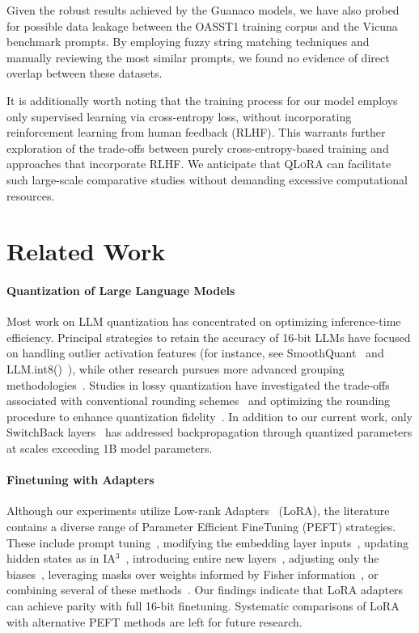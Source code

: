 Given the robust results achieved by the {Guanaco} models, we have also probed for possible data leakage between the OASST1 training corpus and the Vicuna benchmark prompts. By employing fuzzy string matching techniques and manually reviewing the most similar prompts, we found no evidence of direct overlap between these datasets.

It is additionally worth noting that the training process for our model employs only supervised learning via cross-entropy loss, without incorporating reinforcement learning from human feedback (RLHF). This warrants further exploration of the trade-offs between purely cross-entropy-based training and approaches that incorporate RLHF. We anticipate that \textsc{QLoRA} can facilitate such large-scale comparative studies without demanding excessive computational resources.

\section{Related Work}

\paragraph{Quantization of Large Language Models} Most work on LLM quantization has concentrated on optimizing inference-time efficiency. Principal strategies to retain the accuracy of 16-bit LLMs have focused on handling outlier activation features (for instance, see SmoothQuant~\citep{xiao2022smoothquant} and LLM.int8()~\citep{dettmers2022llm}), while other research pursues more advanced grouping methodologies~\citep{park2022nuqmm, yao2022zeroquant}. Studies in lossy quantization have investigated the trade-offs associated with conventional rounding schemes~\citep{dettmers2022case,zeng2022glm,pope2022efficiently} and optimizing the rounding procedure to enhance quantization fidelity~\citep{frantar2022gptq}. In addition to our current work, only SwitchBack layers~\citep{wortsman2023stable} has addressed backpropagation through quantized parameters at scales exceeding 1B model parameters.

\paragraph{Finetuning with Adapters} Although our experiments utilize Low-rank Adapters~\citep{hu2021lora} (LoRA), the literature contains a diverse range of Parameter Efficient FineTuning (PEFT) strategies. These include prompt tuning~\citep{qin2021learning,lester2021power,li2021prefix}, modifying the embedding layer inputs~\citep{an2022input}, updating hidden states as in IA$^3$~\citep{liu2022few}, introducing entire new layers~\citep{houlsby2019parameter}, adjusting only the biases~\citep{zaken2021bitfit}, leveraging masks over weights informed by Fisher information~\citep{sung2021training}, or combining several of these methods~\citep{henderson2021compacter}. Our findings indicate that LoRA adapters can achieve parity with full 16-bit finetuning. Systematic comparisons of LoRA with alternative PEFT methods are left for future research.

